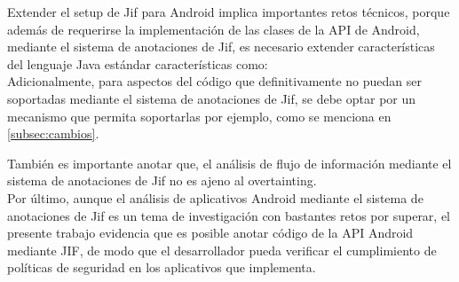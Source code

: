 Extender el setup de Jif para Android implica importantes retos
técnicos, porque además de requerirse la implementación de las clases de la API
de Android, mediante el sistema de anotaciones de Jif, es necesario extender
características del lenguaje Java estándar características como:\\
Adicionalmente, para aspectos del código que definitivamente no puedan ser
soportadas mediante el sistema de anotaciones de Jif, se debe optar por un
mecanismo que permita soportarlas por ejemplo, como se menciona en
\ref{subsec:cambios}.

También es importante anotar que, el análisis de flujo de información mediante
el sistema de anotaciones de Jif no es ajeno al overtainting.\\

Por último, aunque el análisis de aplicativos Android mediante el sistema de
anotaciones de Jif es un tema de investigación con bastantes retos por superar,
el presente trabajo evidencia que es posible anotar código de la API Android
mediante JIF, de modo que el desarrollador pueda verificar el cumplimiento de
políticas de seguridad en los aplicativos que implementa.

% 
% 
% 




